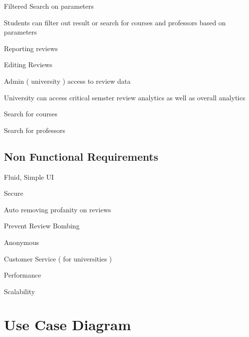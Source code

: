 \documentclass{article}
\begin{document}
	\quad Filtered Search on parameters 
	\vspace{-0.2cm}

	\qquad \scriptsize Students can filter out result or search for courses and professors based on parameters \normalsize

	\quad Reporting reviews

	\quad Editing Reviews

	\quad Admin ( university ) access to review data 
	\vspace{-0.2cm} 

	\qquad \scriptsize University can access critical semster review analytics as well as overall analytics \normalsize

	\quad Search for courses 

	\quad Search for professors 



\subsection{Non Functional Requirements} 

	\quad Fluid, Simple UI

	\quad Secure

	\quad Auto removing profanity on reviews

	\quad Prevent Review Bombing

	\quad Anonymous

	\quad Customer Service ( for universities )

	\quad Performance

	\quad Scalability

\section{Use Case Diagram} 
\end{document}

